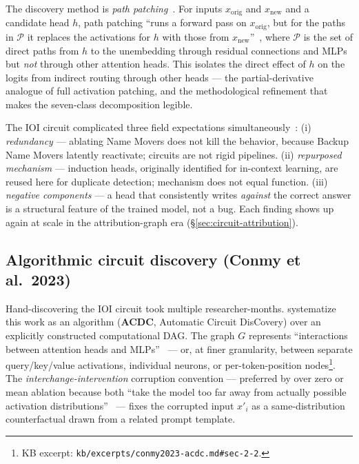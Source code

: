 The discovery method is \emph{path patching}~\citep[\S 3.1]{wang2022-ioi}.
For inputs $x_{\text{orig}}$ and $x_{\text{new}}$ and a candidate head
$h$, path patching ``runs a forward pass on $x_{\text{orig}}$, but for
the paths in $\mathcal{P}$ it replaces the activations for $h$ with
those from $x_{\text{new}}$''~\citep[\S 3.1]{wang2022-ioi}, where
$\mathcal{P}$ is the set of direct paths from $h$ to the unembedding
through residual connections and MLPs but \emph{not} through other
attention heads. This isolates the direct effect of $h$ on the logits
from indirect routing through other heads --- the partial-derivative
analogue of full activation patching, and the methodological refinement
that makes the seven-class decomposition legible.

The IOI circuit complicated three field expectations
simultaneously~\citep[\S 3]{wang2022-ioi}:
(i) \emph{redundancy} --- ablating Name Movers does not kill the
behavior, because Backup Name Movers latently reactivate; circuits are
not rigid pipelines.
(ii) \emph{repurposed mechanism} --- induction heads, originally
identified for in-context learning, are reused here for duplicate
detection; mechanism does not equal function.
(iii) \emph{negative components} --- a head that consistently writes
\emph{against} the correct answer is a structural feature of the
trained model, not a bug. Each finding shows up again at scale in the
attribution-graph era (\S\ref{sec:circuit-attribution}).

\subsection{Algorithmic circuit discovery (Conmy et al.\ 2023)}
\label{sec:circuit-acdc}

Hand-discovering the IOI circuit took multiple researcher-months.
\citet{conmy2023-acdc} systematize this work as an algorithm
(\textbf{ACDC}, Automatic Circuit DisCovery) over an explicitly
constructed computational DAG. The graph $G$ represents ``interactions
between attention heads and MLPs''~\citep[\S 2.2]{conmy2023-acdc} ---
or, at finer granularity, between separate query/key/value activations,
individual neurons, or per-token-position
nodes\footnote{KB excerpt:
\texttt{kb/excerpts/conmy2023-acdc.md\#sec-2-2}.}. The
\emph{interchange-intervention} corruption convention --- preferred by
\citet{conmy2023-acdc} over zero or mean ablation because both ``take
the model too far away from actually possible activation
distributions''~\citep[\S 2.3]{conmy2023-acdc} --- fixes the corrupted
input $x'_i$ as a same-distribution counterfactual drawn from a
related prompt template.

